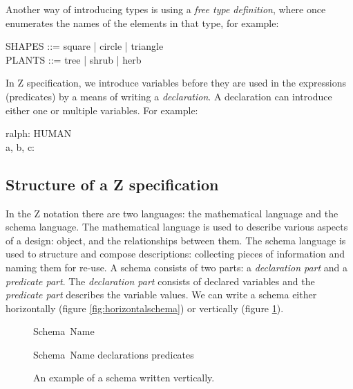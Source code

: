 Another way of introducing types is using a \textit{free type definition}, where once enumerates the names of the elements in that type, for example:

\begin{zed}
SHAPES ::= square | circle | triangle \\
PLANTS ::= tree | shrub | herb \\
\end{zed}

In Z specification, we introduce variables before they are used in the expressions (predicates) by a means of writing a \textit{declaration}. A declaration can introduce either one or multiple variables. For example:

\begin{zed}
ralph: HUMAN \\
a, b, c: \nat
\end{zed}

\subsection{Structure of a Z specification}

In the Z notation there are two languages: the mathematical language and the schema language. The mathematical language is used to describe various aspects of a design: object, and the relationships between them. The schema language is used to structure and compose descriptions: collecting pieces of information and naming them for re-use. A schema consists of two parts: a \emph{declaration part} and a \emph{predicate part}. The \emph{declaration part} consists of declared variables and the \emph{predicate part} describes the variable values. We can write a schema either horizontally (figure \ref{fig:horizontalschema}) or vertically (figure \ref{fig:verticalschema}).

\begin{figure}[H]
\vspace{-0.2in}
\centering
\begin{minipage}{0.45\textwidth}
\begin{zed}
\noindent Schema\ Name 
\end{zed}
\vspace{-0.18in}
\caption{An example of a schema written horizontally.\label{fig:horizontalschema}}
\vspace{-0.2in}
\end{minipage}\hfill
\begin{minipage}{0.45\textwidth}
\begin{schema}{Schema\ Name}
declarations
\where
predicates
\end{schema}
\vspace{-0.2in}
\caption{An example of a schema written vertically. \label{fig:verticalschema}}
\vspace{-0.2in}
\end{minipage}
\end{figure}


